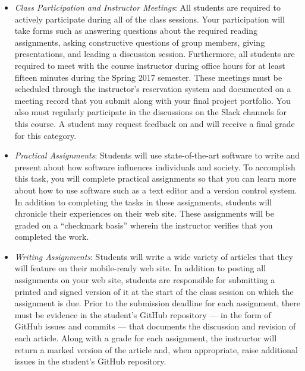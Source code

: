 \begin{itemize}

  \itemsep0em

  \item {\em Class Participation and Instructor Meetings\/}: All students are required to actively participate during
    all of the class sessions. Your participation will take forms such as answering questions about the required reading
    assignments, asking constructive questions of group members, giving presentations, and leading a discussion session.
    Furthermore, all students are required to meet with the course instructor during office hours for at least fifteen
    minutes during the Spring 2017 semester. These meetings must be scheduled through the instructor's reservation
    system and documented on a meeting record that you submit along with your final project portfolio. You also must
    regularly participate in the discussions on the Slack channels for this course. A student may request feedback on
    and will receive a final grade for this category.

  \item {\em Practical Assignments\/}: Students will use state-of-the-art software to write and present about how software
    influences individuals and society. To accomplish this task, you will complete practical assignments so that you can
    learn more about how to use software such as a text editor and a version control system. In addition to completing
    the tasks in these assignments, students will chronicle their experiences on their web site. These assignments will
    be graded on a ``checkmark basis'' wherein the instructor verifies that you completed the work.

  \item {\em Writing Assignments\/}: Students will write a wide variety of articles that they will feature on their
    mobile-ready web site. In addition to posting all assignments on your web site, students are responsible for
    submitting a printed and signed version of it at the start of the class session on which the assignment is due.
    Prior to the submission deadline for each assignment, there must be evidence in the student's GitHub repository ---
    in the form of GitHub issues and commits --- that documents the discussion and revision of each article. Along with
    a grade for each assignment, the instructor will return a marked version of the article and, when appropriate, raise
    additional issues in the student's GitHub repository.


\end{itemize}

